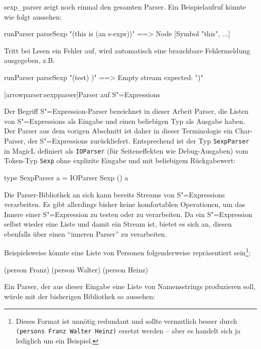 \documentclass[11pt, a4paper, bibgerm]{scrbook}
\newenvironment{DIFnomarkup}{}{}
\newcommand\icode[1]{\lstinline?#1?}
\newcommand\lsection{}
\newcommand\abb{}
\newcommand{\sexp}{S"=Expression}
\newcommand{\sexps}{S"=Expressions}
\begin{document}
\abb{sexp_parser} zeigt noch einmal den gesamten Parser. Ein
Beispielaufruf könnte wie folgt aussehen:
\begin{code}
runParser parseSexp "(this is (an s-expr))"  ==> Node [Symbol "this", ...]
\end{code}
Tritt bei Lesen ein Fehler auf, wird automatisch eine brauchbare
Fehlermeldung ausgegeben, z.B.
\begin{DIFnomarkup}\begin{code}
runParser parseSexp "(test) )"  ==>  Empty stream expected: ")"
\end{code}\end{DIFnomarkup}

\lsection[arrowparser:sexpparser]{Parser auf \sexps}

Der Begriff \sexp{}-Parser bezeichnet in dieser Arbeit Parser, die
Listen von \sexps{} als Eingabe und einen beliebigen Typ als Ausgabe
haben. Der Parser aus dem vorigen Abschnitt ist daher in dieser
Terminologie ein Char-Parser, der \sexps{} zurückliefert. Entsprechend
ist der Typ \icode{SexpParser} in MagicL definiert als \icode{IOParser} (für
Seiteneffekten wie Debug-Ausgaben) vom Token-Typ \icode{Sexp} ohne
explizite Eingabe und mit beliebigem Rückgabewert:
\begin{DIFnomarkup}\begin{code}
type SexpParser a = IOParser Sexp () a  
\end{code}\end{DIFnomarkup}
Die Parser-Bibliothek an sich kann bereits Streams von \sexps{}
verarbeiten. Es gibt allerdings bisher keine komfortablen Operationen,
um das Innere einer \sexp{} zu testen oder zu verarbeiten. Da ein
\sexp{} selbst wieder eine Liste und damit ein Stream ist, bietet es
sich an, diesen ebenfalls über einen "`inneren Parser"' zu verarbeiten.

Beispielsweise könnte eine Liste von Personen folgenderweise
repräsentiert sein\footnote{Dieses Format ist unnötig redundant und
  sollte vermutlich besser durch \icode{(persons Franz Walter Heinz)}
  ersetzt werden -- aber es handelt sich ja lediglich um ein Beispiel.}:
\begin{DIFnomarkup}\begin{code}
(person Franz)
(person Walter)
(person Heinz)
\end{code}\end{DIFnomarkup}

Ein Parser, der aus dieser Eingabe eine Liste von Namensstrings
produzieren soll, würde mit der bisherigen Bibliothek so aussehen:
\end{document}
